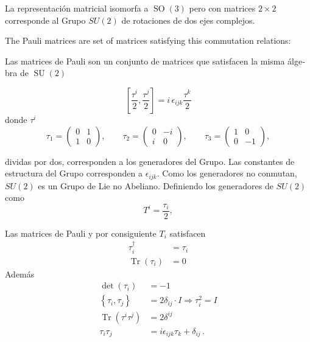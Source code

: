 La representación matricial isomorfa a $\operatorname{SO}(3)$ pero con matrices $2\times2$ corresponde al Grupo $SU(2)$ de rotaciones de dos ejes complejos.
\begin{english}
  The Pauli matrices are set of matrices satisfying this commutation relations:
\end{english}
\begin{spanish}
Las matrices de Pauli son un conjunto de matrices que satisfacen la misma álgebra de $\operatorname{SU}(2)$
\end{spanish}
\begin{frame}
\begin{equation}
  \label{eq:paulialg}
  \left[\frac{\tau^i}{2},\frac{\tau^j}{2} \right]=i\,\epsilon_{ijk}\frac{\tau^k}{2}
\end{equation}
donde $\tau^i$ 
\begin{equation}
  \label{eq:paulimatr}
  \tau_1=
  \begin{pmatrix}
    0&1\\
    1&0
  \end{pmatrix}, \qquad
 \tau_2=
  \begin{pmatrix}
    0&-i\\
    i&0
  \end{pmatrix},\qquad 
 \tau_3=
  \begin{pmatrix}
    1&0\\
    0&-1
  \end{pmatrix},
 \end{equation}

dividas por dos, corresponden a los generadores del Grupo. Las constantes de estructura del Grupo corresponden a $\epsilon_{ijk}$. Como los generadores no conmutan, $SU(2)$ es un Grupo de Lie no Abeliano. Definiendo los generadores de $SU(2)$ como
\begin{equation}
  T^i=\frac{\tau_i}{2},
\end{equation}
\end{frame}

Las matrices de Pauli y por consiguiente $T_i$ satisfacen 
\begin{align}
  \tau_i^\dagger&=\tau_i\nonumber\\
  \operatorname{Tr}  \left(
    \tau_i
  \right)&=0
\end{align}
Además
\begin{align}
  \label{eq:64qft}
  \det
  \left(
    \tau_i
  \right)&=-1\nonumber\\
  \left\{ 
    \tau_i,\tau_j
  \right\}&=2\delta_{ij}\cdot I\Rightarrow\tau_i^2=I\nonumber \\
\operatorname{Tr} \left(\tau^i\tau^j\right)&=2\delta^{ij}\nonumber\\
\tau_i\tau_j&=i\epsilon_{ijk}\tau_k+\delta_{ij}\,.
\end{align}

